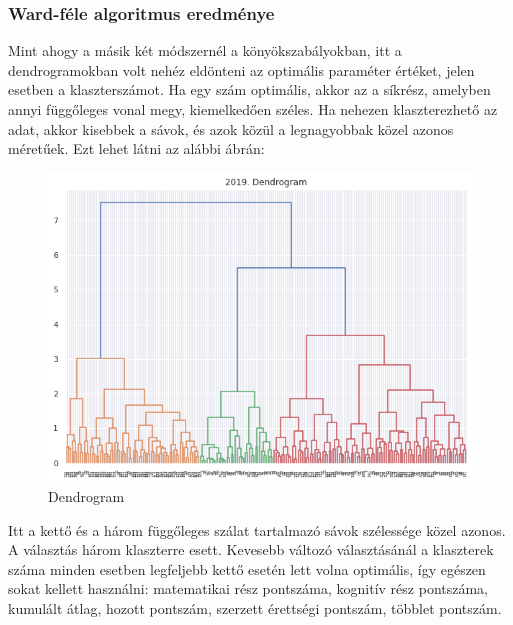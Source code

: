\documentclass[12pt]{article}
\begin{document}
\subsubsection{Ward-féle algoritmus eredménye}

Mint ahogy a másik két módszernél a könyökszabályokban, itt a dendrogramokban volt nehéz eldönteni az optimális paraméter értéket, jelen esetben a klaszterszámot. Ha egy szám optimális, akkor az a síkrész, amelyben annyi függőleges vonal megy, kiemelkedően széles. Ha nehezen klaszterezhető az adat, akkor kisebbek a sávok, és azok közül a legnagyobbak közel azonos méretűek. Ezt lehet látni az alábbi ábrán:

\begin{figure}[H]
\centering
\includegraphics[width = \textwidth]{kepek/dendrogram.png}
\caption{Dendrogram}
\label{fig:dendrogram}
\end{figure}

Itt a kettő és a három függőleges szálat tartalmazó sávok szélessége közel azonos. A választás három klaszterre esett. Kevesebb változó választásánál a klaszterek száma minden esetben legfeljebb kettő esetén lett volna optimális, így egészen sokat kellett használni: matematikai rész pontszáma, kognitív rész pontszáma, kumulált átlag, hozott pontszám, szerzett érettségi pontszám, többlet pontszám.
\end{document}
